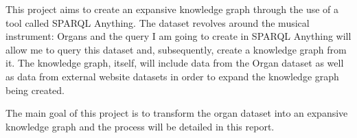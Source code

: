 This project aims to create an expansive knowledge graph through the use of a tool called SPARQL Anything. The dataset revolves around the musical instrument: Organs and the query I am going to create in SPARQL Anything will allow me to query this dataset and, subsequently, create a knowledge graph from it. The knowledge graph, itself, will include data from the Organ dataset as well as data from external website datasets in order to expand the knowledge graph being created. 

The main goal of this project is to transform the organ dataset into an expansive knowledge graph and the process will be detailed in this report. 

